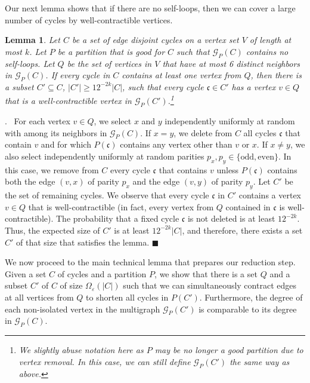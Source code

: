 \documentclass[11pt]{article}
\newenvironment{proof}{\noindent {\bf Proof}.\ }{\qed \par\vskip 4mm\par}
\newtheorem{lemma}[theorem]{Lemma}
\newcommand{\sq}{\hbox{\rlap{$\sqcap$}$\sqcup$}}
\newcommand{\qed}{\hspace*{\fill}\sq}
\renewcommand{\qed}{\hspace*{\fill}\ensuremath{\blacksquare}}
\def\epsilon{\ensuremath{\varepsilon}}
\begin{document}
Our next lemma shows that if there are no self-loops, then we can cover a large number of cycles by well-contractible vertices.

\begin{lemma}
\label{lemma:contractible-vertices}
Let $C$ be a set of edge disjoint cycles on a vertex set $V$ of length at most $k$. Let $P$ be a partition that is good for $C$ such that $\mathcal G_P(C)$ contains no self-loops. Let $Q$ be the set of vertices in $V$ that have at most 6 distinct neighbors in $\mathcal G_P(C)$. If every cycle in $C$ contains at least one vertex from $Q$, then there is a subset $C' \subseteq C$, $|C'| \ge 12^{-2k} |C|$, such that every cycle $\mathfrak{c} \in C'$ has a vertex $v\in Q$ that is a well-contractible vertex in $\mathcal G_P(C')$.\footnote{We slightly abuse notation here as $P$ may be no longer a good partition due to vertex removal. In this case, we can still define $\mathcal G_{P}(C')$ the same way as above.}
\end{lemma}

\begin{proof}
For each vertex $v \in Q$, we select $x$ and $y$ independently uniformly at random with among its neighbors in $\mathcal G_P(C)$. If $x = y$, we delete from $C$ all cycles $\mathfrak{c}$ that contain $v$ and for which $P(\mathfrak{c})$ contains any vertex other than $v$ or $x$.
If $x \ne y$, we also select independently uniformly at random parities $p_x, p_y \in \{\mbox{odd},\mbox{even}\}$. In this case, we remove from $C$ every cycle $\mathfrak{c}$ that contains $v$ unless $P(\mathfrak{c})$ contains both the edge $(v,x)$ of parity $p_x$ and the edge $(v,y)$ of parity $p_y$. Let $C'$ be the set of remaining cycles. We observe that every cycle $\mathfrak{c}$ in $C'$ contains a vertex $v\in Q$ that is well-contractible (in fact, every vertex from $Q$ contained in $\mathfrak{c}$ is well-contractible). The probability that a fixed cycle $\mathfrak{c}$ is not deleted is at least $12^{-2k}$. Thus, the expected size of $C'$ is at least $12^{-2k} |C|$, and therefore, there exists a set $C'$ of that size that satisfies the lemma.
\end{proof}

We now proceed to the main technical lemma that prepares our reduction step. Given a set $C$ of cycles and a partition $P$, we show that there is a set $Q$ and a subset $C'$ of $C$ of size $\Omega_{\epsilon}(|C|)$ such that we can simultaneously contract edges at all vertices from $Q$ to shorten all cycles in $P(C')$. Furthermore, the degree of each non-isolated vertex in the multigraph $\mathcal G_P(C')$ is comparable to its degree in $\mathcal G_P(C)$.
\end{document}
